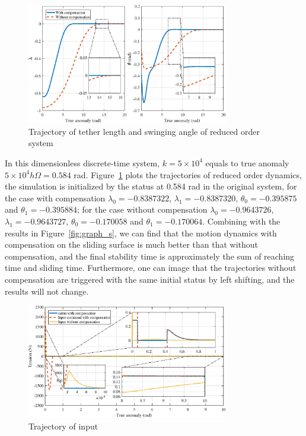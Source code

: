 \documentclass[10pt,onecolumn,draftcls]{IEEEtran}
\begin{document}
\begin{figure}[htbp] 
	\centering
\includegraphics[width=250pt]{reducedsystem.eps}
\caption{Trajectory of tether length and swinging angle of reduced order  system} \label{fig:graph_reduced_system}
\end{figure} 

In this dimensionless discrete-time system, $k=5\times 10^4$ equals to true anomaly $5\times 10^4h\Omega=0.584 $ rad. Figure~\ref{fig:graph_reduced_system} plots the trajectories of reduced order  dynamics, the simulation is initialized by the status at 0.584 rad in the original system, for the case with compensation $\lambda_0 =-0.8387322$, $\lambda_1 =-0.8387320$, $\theta_0 =-0.395875$ and $\theta_1 =-0.395884$; for the case without compensation $\lambda_0 =-0.9643726$, $\lambda_1 =-0.9643727$, $\theta_0 =-0.170058$ and $\theta_1 =-0.170064$. Combining with the results in Figure~\ref{fig:graph_s}, we can find that the motion dynamics with compensation on the sliding surface is much better than that without compensation, and the final stability time is approximately the sum of reaching time and sliding time. Furthermore, one can image that the trajectories without compensation are triggered with the same initial status by left shifting, and the results will not change. 
 
\begin{figure}[htbp] 
	\centering
\includegraphics[width=250pt]{input.eps}
\caption{Trajectory of input} \label{fig:graph_input}
\end{figure} 
\end{document}

